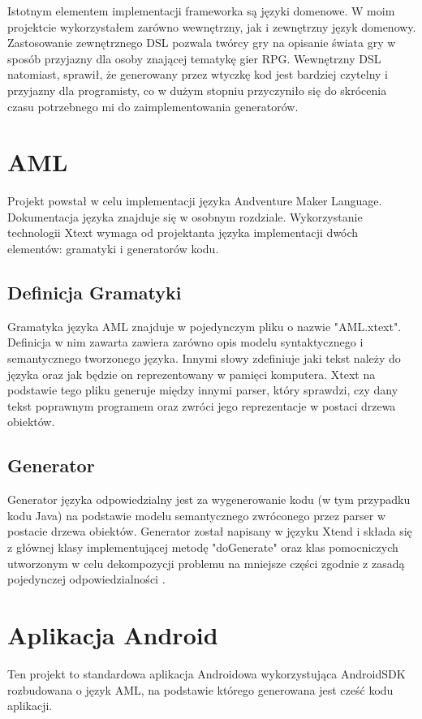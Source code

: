 \documentclass{xmgr}
\begin{document}
Istotnym elementem implementacji frameworka są języki domenowe. W moim projektcie wykorzystałem zarówno wewnętrzny, jak i zewnętrzny język domenowy. Zastosowanie zewnętrznego DSL pozwala twórcy gry na opisanie świata gry w sposób przyjazny dla osoby znającej tematykę gier RPG. Wewnętrzny DSL natomiast, sprawił, że generowany przez wtyczkę kod jest bardziej czytelny i przyjazny dla programisty, co w dużym stopniu przyczyniło się do skrócenia czasu potrzebnego mi do zaimplementowania generatorów.

\section{AML} 
Projekt powstał w celu implementacji języka Andventure Maker Language. Dokumentacja języka znajduje się w osobnym rozdziale. Wykorzystanie technologii Xtext \cite{Xtext:2017:Doc} wymaga od projektanta języka implementacji dwóch elementów: gramatyki i generatorów kodu. 

\subsection{Definicja Gramatyki} 

Gramatyka języka AML znajduje w pojedynczym pliku o nazwie "AML.xtext". Definicja w nim zawarta zawiera zarówno opis modelu syntaktycznego i semantycznego tworzonego języka. Innymi słowy zdefiniuje jaki tekst należy do języka oraz jak będzie on reprezentowany w pamięci komputera. Xtext na podstawie tego pliku generuje między innymi parser, który sprawdzi, czy dany tekst poprawnym programem oraz zwróci jego reprezentacje w postaci drzewa obiektów.

\subsection{Generator}
Generator języka odpowiedzialny jest za wygenerowanie kodu (w tym przypadku kodu Java) na podstawie modelu semantycznego zwróconego przez parser w postacie drzewa obiektów. Generator został napisany w języku Xtend i składa się z głównej klasy implementującej metodę "doGenerate" oraz klas pomocniczych utworzonym w celu dekompozycji problemu na mniejsze części zgodnie z zasadą pojedynczej odpowiedzialności \cite{CleanCode:2005}.

\section{Aplikacja Android}
Ten projekt to standardowa aplikacja Androidowa wykorzystująca AndroidSDK rozbudowana o język AML, na podstawie którego generowana jest cześć kodu aplikacji.
\end{document}
